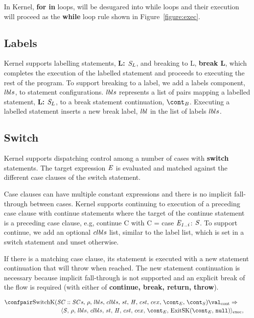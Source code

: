 \documentclass{article}
\newcommand{\cesktranssplit}[2]{\ensuremath{{#1} \Rightarrow\\ {#2}}}
\begin{document}
In Kernel, \textbf{for in} loops, will be desugared into while loops and their execution will proceed as the \textbf{while} loop rule shown in Figure~\ref{figure:exec}.


\subsection{Labels}

Kernel supports labelling statements, \textbf{L: $\mathit{S}_{L}$}, and breaking to L, \textbf{break L}, which completes the execution of the labelled statement and proceeds to executing the rest of the program.
To support breaking to a label, we add a labels component, $lbls$, to statement configurations.
$lbls$ represents a list of pairs mapping a labelled statement, \textbf{L: $\mathit{S}_L$}, to a break statement continuation, $\bcont$.
Executing a labelled statement inserts a new break label, $lbl$ in the list of labels $lbls$.


\subsection{Switch}

Kernel supports dispatching control among a number of cases with \textbf{switch} statements.
The target expression $\mathit{E}$ is evaluated and matched against the different case clauses of the switch statement.

Case clauses can have multiple constant expressions and there is no implicit fall-through between cases.
Kernel supports continuing to execution of a preceding case clause with continue statements where the target of the continue statement is a preceding case clause, e.g, continue C with C = case $\mathit{E}_\mathit{1..i}$: $\mathit{S}$.
To support continue, we add an optional $clbls$ list, similar to the label list, which is set in a switch statement and unset otherwise.

If there is a matching case clause, its statement is executed with a new statement continuation that will throw when reached.
The new statement continuation is necessary because implicit fall-through is not supported and an explicit break of the flow is required (with either of \textbf{continue, break, return, throw}).

\begin{align*}
    &\begin{multlined}
        \cesktranssplit%
            {\contconf{\SwitchK{\scase :: \scases}{\clbls}}{\val}}%
            {\execconf{\stmt}{\env}{\lbls}{\clbls}{\handler}{\cstrace}{\cex}{\econt}{\ExitSK{\tt{null}}}},
    \end{multlined}
\end{align*}
\end{document}
